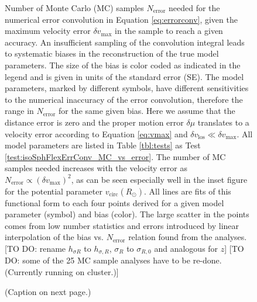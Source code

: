 
\begin{figure}
\caption{Number of Monte Carlo (MC) samples $N_\text{error}$ needed for the numerical error convolution in Equation \ref{eq:errorconv}, given the maximum velocity error $\delta v_\text{max}$ in the sample to reach a given accuracy.  An insufficient sampling of the convolution integral leads to systematic biases in the reconstruction of the true model parameters. The size of the bias is color coded as indicated in the legend and is given in units of the standard error (SE).  The model parameters, marked by different symbols, have different sensitivities to the numerical inaccuracy of the error convolution, therefore the range in $N_\text{error}$ for the same given bias. Here we assume that the distance error is zero and the proper motion error $\delta \mu$ translates to a velocity error according to Equation \ref{eq:vmax} and $\delta v_\text{los} \ll \delta v_\text{max}$. All model parameters are listed in Table \ref{tbl:tests} as Test \ref{test:isoSphFlexErrConv_MC_vs_error}. The number of MC samples needed increases with the velocity error as $N_\text{error} \propto \left( \delta v_\text{max} \right)^2$, as can be seen especially well in the inset figure for the potential parameter $v_\text{circ}(R_\odot)$. All lines are fits of this functional form to each four points derived for a given model parameter (symbol) and bias (color). The large scatter in the points comes from low number statistics and errors introduced by linear interpolation of the bias vs. $N_\text{error}$ relation found from the analyses. [TO DO: rename $h_{\sigma R}$ to $h_{\sigma,R}$, $\sigma_R$ to $\sigma_{R,0}$ and analogous for $z$] [TO DO: some of the 25 MC sample analyses have to be re-done. (Currently running on cluster.)]}
\label{fig:isoSphFlexErrConv_MC_vs_error}
\end{figure}



\begin{figure}
\caption{(Caption on next page.)}
\end{figure}

